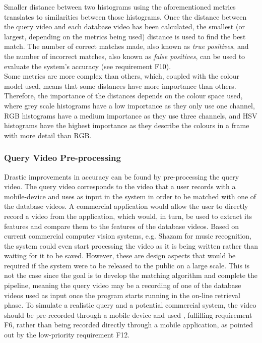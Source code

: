 Smaller distance between two histograms using the aforementioned metrics translates to similarities between those histograms. Once the distance between the query video and each database video has been calculated, the smallest (or largest, depending on the metrics being used) distance is used to find the best match. The number of correct matches made, also known as \textit{true positives}, and the number of incorrect matches, also known as \textit{false positives}, can be used to evaluate the system's accuracy (see requirement F10).\\

Some metrics are more complex than others, which, coupled with the colour model used, means that some distances have more importance than others. Therefore, the importance of the distances depends on the colour space used, where grey scale histograms have a low importance as they only use one channel, RGB histograms have a medium importance as they use three channels, and HSV histograms have the highest importance as they describe the colours in a frame with more detail than RGB.


\subsubsection{Query Video Pre-processing}
\label{sec:design-query-video-processing}

Drastic improvements in accuracy can be found by pre-processing the query video. The query video corresponds to the video that a user records with a mobile-device and uses as input in the system in order to be matched with one of the database videos. A commercial application would allow the user to directly record a video from the application, which would, in turn, be used to extract its features and compare them to the features of the database videos. Based on current commercial computer vision systems, e.g. Shazam for music recognition, the system could even start processing the video as it is being written rather than waiting for it to be saved. However, these are design aspects that would be required if the system were to be released to the public on a large scale. This is not the case since the goal is to develop the matching algorithm and complete the pipeline, meaning the query video may be a recording of one of the database videos used as input once the program starts running in the on-line retrieval phase. To simulate a realistic query and a potential commercial system, the video should be pre-recorded through a mobile device and used , fulfilling requirement F6, rather than being recorded directly through a mobile application, as pointed out by the low-priority requirement F12.\\

